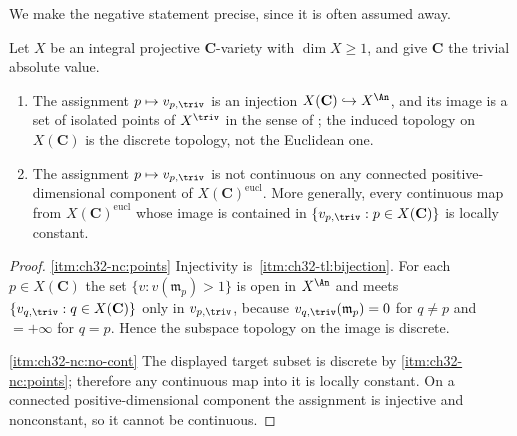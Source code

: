 We make the negative statement precise, since it is often assumed away.

\begin{proposition}
\label{prop:ch32-no-complexification-map}
Let $X$ be an integral projective $\mathbf C$-variety with
$\dim X\geq1$, and give $\mathbf C$ the trivial absolute value.
\begin{enumerate}
\item\label{itm:ch32-nc:points}
The assignment $p\mapsto v_{p,\triv}$ is an injection
$X(\mathbf C)\hookrightarrow X^{\An}$, and its image is a set of isolated
points of $X^{\triv}$ in the sense of
; the induced topology on
$X(\mathbf C)$ is the discrete topology, not the Euclidean one.
\item\label{itm:ch32-nc:no-cont}
The assignment $p\mapsto v_{p,\triv}$ is not continuous on any connected
positive-dimensional component of $X(\mathbf C)^{\mathrm{eucl}}$.  More
generally, every continuous map from $X(\mathbf C)^{\mathrm{eucl}}$ whose
image is contained in $\{v_{p,\triv}:p\in X(\mathbf C)\}$ is locally
constant.
\end{enumerate}
\end{proposition}

\begin{proof}
\cref{itm:ch32-nc:points}  Injectivity is
\,\cref{itm:ch32-tl:bijection}.  For each
$p\in X(\mathbf C)$ the set $\{v:v(\mathfrak m_p)>1\}$ is open in
$X^{\An}$ and meets $\{v_{q,\triv}:q\in X(\mathbf C)\}$ only in
$v_{p,\triv}$, because $v_{q,\triv}(\mathfrak m_p)=0$ for $q\neq p$
and $=+\infty$ for $q=p$.  Hence the subspace topology on the image is
discrete.

\cref{itm:ch32-nc:no-cont}  The displayed target subset is discrete by
\cref{itm:ch32-nc:points}; therefore any continuous map into it is locally
constant.  On a connected positive-dimensional component the assignment is
injective and nonconstant, so it cannot be continuous.
\end{proof}


